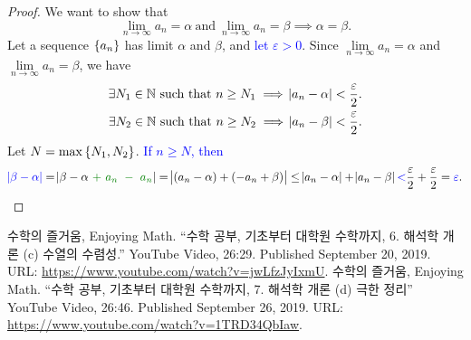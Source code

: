 \documentclass[11pt,openany]{article}
\begin{document}
\begin{proof}
We want to show that \[
\lim\limits_{n\to\infty}a_n=\alpha\ \text{and}\ \lim\limits_{n\to\infty}a_n=\beta\implies\alpha=\beta.
\] Let a sequence $\set{a_n}$ has limit $\alpha$ and $\beta$, and \textcolor{blue}{let $\varepsilon>0$}. Since $\lim\limits_{n\to\infty}a_n=\alpha$ and $\lim\limits_{n\to\infty}a_n=\beta$, we have \begin{align*}
	\exists N_1\in\mathbb{N}\ \text{such that}\ n\geq N_1\implies\abs{a_n-\alpha}<\frac{\varepsilon}{2}.\\
	\exists N_2\in\mathbb{N}\ \text{such that}\ n\geq N_2\implies\abs{a_n-\beta}<\frac{\varepsilon}{2}.
\end{align*}
Let \textcolor{blue}{$N=\max\set{N_1,N_2}$}. \textcolor{blue}{If $n\geq N$, then} \[
	\textcolor{blue}{\abs{\beta-\alpha}}=\abs{\beta-\alpha\textcolor{green!50!black}{\ +\ a_n\ -\ a_n}}
	=\abs{(a_n-\alpha)+(-a_n+\beta)}
	\leq\abs{a_n-\alpha}+\abs{a_n-\beta}
	\textcolor{blue}{<}\frac{\varepsilon}{2}+\frac{\varepsilon}{2}=\textcolor{blue}{\varepsilon}.
\]
\end{proof}


\vfill
\begin{thebibliography}{9}
	수학의 즐거움, Enjoying Math. ``수학 공부, 기초부터 대학원 수학까지, 6. 해석학 개론 (c) 수열의 수렴성.'' YouTube Video, 26:29. Published 
	September 20, 2019. URL: \url{https://www.youtube.com/watch?v=jwLfzJyIxmU}.
	수학의 즐거움, Enjoying Math. ``수학 공부, 기초부터 대학원 수학까지, 7. 해석학 개론 (d) 극한 정리'' YouTube Video, 26:46. Published 
	September 26, 2019. URL: \url{https://www.youtube.com/watch?v=1TRD34QbIaw}.
\end{thebibliography}
\end{document}
